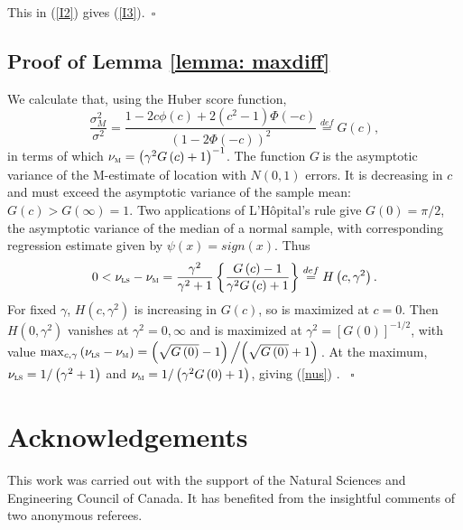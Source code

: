 \documentclass[times, authoryear, 12pt, twoside]{elsarticle}
\begin{document}
This in (\ref{I2}) gives (\ref{I3}).\hfill\ $\square $

\subsection{\protect\bigskip Proof of Lemma \protect\ref{lemma: maxdiff}}

We calculate that, using the Huber score function, 
\begin{equation*}
\frac{\sigma _{M}^{2}}{\sigma ^{2}}=\frac{1-2c\phi \left( c\right) +2\left(
c^{2}-1\right) \Phi \left( -c\right) }{\left( 1-2\Phi \left( -c\right)
\right) ^{2}}\overset{def}{=}G\left( c\right) ,
\end{equation*}%
in terms of which $\nu _{\text{\textsc{m}}}=\left( \gamma ^{2}G\left(
c\right) +1\right) ^{-1}$. The function $G\ $is the asymptotic variance of
the M-estimate of location with $N(0,1)$ errors. It is decreasing in $c$ and
must exceed the asymptotic variance of the sample mean: $G\left( c\right)
>G\left( \infty \right) =1$. Two applications of L'H\^{o}pital's rule give $%
G\left( 0\right) =\pi /2$, the asymptotic variance of the median of a normal
sample, with corresponding regression estimate given by $\psi \left(
x\right) =sign(x)$. Thus 
\begin{equation*}
0<\nu _{\text{\textsc{ls}}}-\nu _{\text{\textsc{m}}}=\frac{\gamma ^{2}}{%
\gamma ^{2}+1}\left\{ \frac{G\left( c\right) -1}{\gamma ^{2}G\left( c\right)
+1}\right\} \overset{def}{=}H\left( c,\gamma ^{2}\right) .
\end{equation*}%
For fixed $\gamma $, $H\left( c,\gamma ^{2}\right) $ is increasing in $%
G\left( c\right) $, so is maximized at $c=0$. Then $H\left( 0,\gamma
^{2}\right) $ vanishes at $\gamma ^{2}=0,\infty $ and is maximized at $%
\gamma ^{2}=\left[ G\left( 0\right) \right] ^{-1/2}$, with value $%
\max_{c,\gamma }\left( \nu _{\text{\textsc{ls}}}-\nu _{\text{\textsc{m}}%
}\right) =\left( \sqrt{G\left( 0\right) }-1\right) \left/ \left( \sqrt{%
G\left( 0\right) }+1\right) \right. $. At the maximum, $\nu _{\text{\textsc{%
ls}}}=1/\left( \gamma ^{2}+1\right) $ and $\nu _{\text{\textsc{m}}}=1/\left(
\gamma ^{2}G\left( 0\right) +1\right) $, giving (\ref{nus}) . \hfill\ $%
\square $

\section*{Acknowledgements}

This work was carried out with the support of the Natural Sciences and
Engineering Council of Canada. It has benefited from the insightful comments of two anonymous referees.



\end{document}

